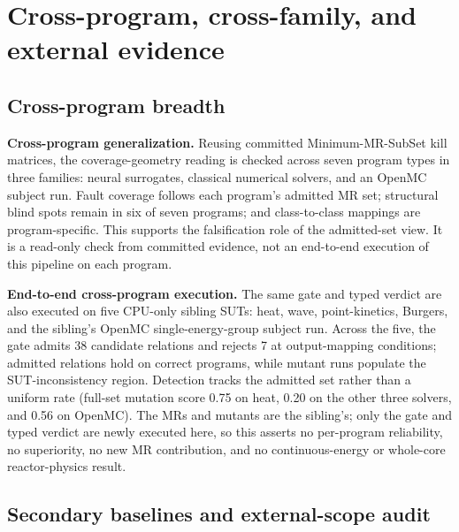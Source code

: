 \section{Cross-program, cross-family, and external evidence}
\label{app:external-evidence}

\subsection{Cross-program breadth}
\label{app:cross-program}

\textbf{Cross-program generalization.} Reusing committed Minimum-MR-SubSet kill matrices, the coverage-geometry reading is checked across seven program types in three families: neural surrogates, classical numerical solvers, and an OpenMC subject run. Fault coverage follows each program's admitted MR set; structural blind spots remain in six of seven programs; and class-to-class mappings are program-specific. This supports the falsification role of the admitted-set view. It is a read-only check from committed evidence, not an end-to-end execution of this pipeline on each program.

\textbf{End-to-end cross-program execution.} The same gate and typed verdict are also executed on five CPU-only sibling SUTs: heat, wave, point-kinetics, Burgers, and the sibling's OpenMC single-energy-group subject run. Across the five, the gate admits 38 candidate relations and rejects 7 at output-mapping conditions; admitted relations hold on correct programs, while mutant runs populate the SUT-inconsistency region. Detection tracks the admitted set rather than a uniform rate (full-set mutation score 0.75 on heat, 0.20 on the other three solvers, and 0.56 on OpenMC). The MRs and mutants are the sibling's; only the gate and typed verdict are newly executed here, so this asserts no per-program reliability, no superiority, no new MR contribution, and no continuous-energy or whole-core reactor-physics result.

\subsection{Secondary baselines and external-scope audit}
\label{app:secondary}
\label{subsec:llm-mr-baseline}

